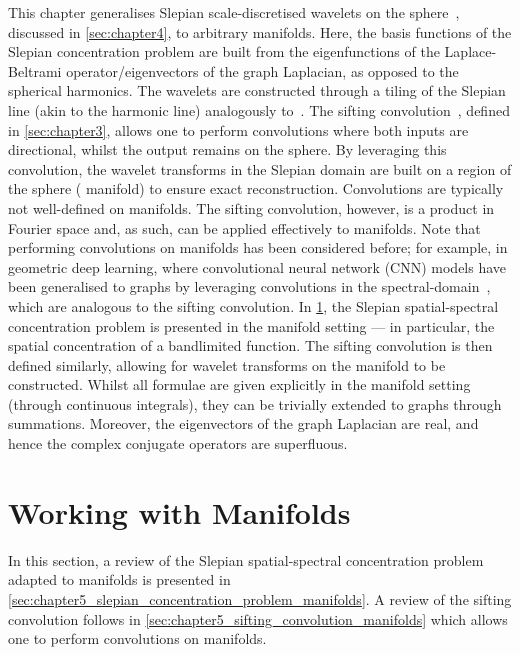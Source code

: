 This chapter generalises Slepian scale-discretised wavelets on the sphere~\cite{Roddy2022}, discussed in \cref{sec:chapter4}, to arbitrary manifolds.
Here, the basis functions of the Slepian concentration problem are built from the eigenfunctions of the Laplace-Beltrami operator/eigenvectors of the graph Laplacian, as opposed to the spherical harmonics.
The wavelets are constructed through a tiling of the Slepian line (akin to the harmonic line) analogously to~\cite{Wiaux2008,McEwen2018}.
The sifting convolution~\cite{Roddy2021}, defined in \cref{sec:chapter3}, allows one to perform convolutions where both inputs are directional, whilst the output remains on the sphere.
By leveraging this convolution, the wavelet transforms in the Slepian domain are built on a region of the sphere (\cf{} manifold) to ensure exact reconstruction.
Convolutions are typically not well-defined on manifolds.
The sifting convolution, however, is a product in Fourier space and, as such, can be applied effectively to manifolds.
Note that performing convolutions on manifolds has been considered before; for example, in geometric deep learning, where convolutional neural network (CNN) models have been generalised to graphs by leveraging convolutions in the spectral-domain~\cite{Bruna2014,Henaff2015,Defferrard2016}, which are analogous to the sifting convolution.
In \cref{sec:chapter5_working_with_manifolds}, the Slepian spatial-spectral concentration problem is presented in the manifold setting --- in particular, the spatial concentration of a bandlimited function.
The sifting convolution is then defined similarly, allowing for wavelet transforms on the manifold to be constructed.
Whilst all formulae are given explicitly in the manifold setting (through continuous integrals), they can be trivially extended to graphs through summations.
Moreover, the eigenvectors of the graph Laplacian are real, and hence the complex conjugate operators are superfluous.

\section{Working with Manifolds}\label{sec:chapter5_working_with_manifolds}

In this section, a review of the Slepian spatial-spectral concentration problem adapted to manifolds is presented in \cref{sec:chapter5_slepian_concentration_problem_manifolds}.
A review of the sifting convolution follows in \cref{sec:chapter5_sifting_convolution_manifolds} which allows one to perform convolutions on manifolds.

